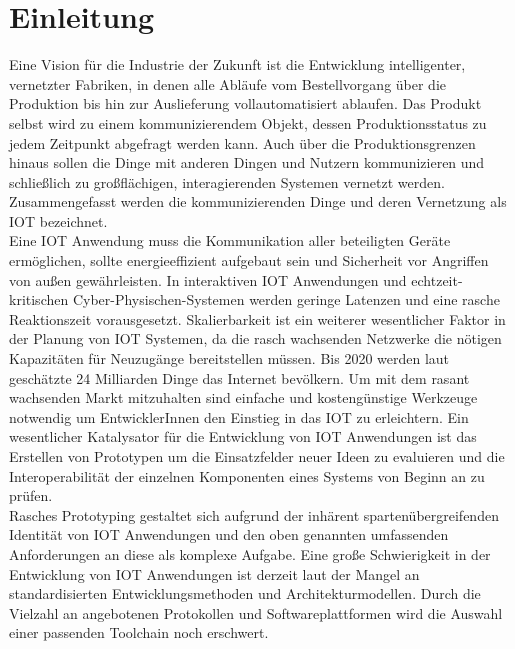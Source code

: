 \documentclass[BMR,Bachelor,ngerman]{twbook}%
\begin{document}
%
%
\chapter{Einleitung}
Eine Vision für die Industrie der Zukunft ist die Entwicklung intelligenter, vernetzter Fabriken, in denen alle Abläufe vom Bestellvorgang über die Produktion bis hin zur Auslieferung vollautomatisiert ablaufen. Das Produkt selbst wird zu einem kommunizierendem Objekt, dessen Produktionsstatus zu jedem Zeitpunkt abgefragt werden kann. Auch über die Produktionsgrenzen hinaus sollen die Dinge mit anderen Dingen und Nutzern kommunizieren und schließlich zu großflächigen, interagierenden Systemen vernetzt werden. Zusammengefasst werden die kommunizierenden Dinge und deren Vernetzung als \acf{IOT} bezeichnet.\\\newline
Eine \ac{IOT} Anwendung muss die Kommunikation aller beteiligten Geräte ermöglichen, sollte energieeffizient aufgebaut sein und Sicherheit vor Angriffen von außen gewährleisten. In interaktiven \ac{IOT} Anwendungen und echtzeit-kritischen Cyber-Physischen-Systemen werden geringe Latenzen und eine rasche Reaktionszeit vorausgesetzt. Skalierbarkeit ist ein weiterer wesentlicher Faktor in der Planung von \ac{IOT} Systemen, da die rasch wachsenden Netzwerke die nötigen Kapazitäten für Neuzugänge bereitstellen müssen. Bis 2020 werden laut  geschätzte 24 Milliarden Dinge das Internet bevölkern. Um mit dem rasant wachsenden Markt mitzuhalten sind einfache und kostengünstige Werkzeuge notwendig um EntwicklerInnen den Einstieg in das \ac{IOT} zu erleichtern. Ein wesentlicher Katalysator für die Entwicklung von \ac{IOT} Anwendungen ist das Erstellen von Prototypen um die Einsatzfelder neuer Ideen zu evaluieren und die Interoperabilität der einzelnen Komponenten eines Systems von Beginn an zu prüfen.\\\newline
%
Rasches Prototyping gestaltet sich aufgrund der inhärent spartenübergreifenden Identität von \ac{IOT} Anwendungen und den oben genannten umfassenden Anforderungen an diese als komplexe Aufgabe. Eine große Schwierigkeit in der Entwicklung von \ac{IOT} Anwendungen ist derzeit laut  der Mangel an standardisierten Entwicklungsmethoden und Architekturmodellen. Durch die Vielzahl an angebotenen Protokollen und Softwareplattformen wird die Auswahl einer passenden Toolchain noch erschwert.\\\newline
\end{document}
